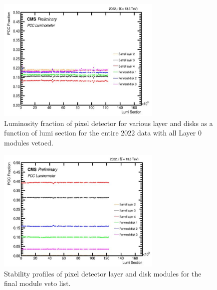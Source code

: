 \begin{figure}[!htp]
  \centering
  \includegraphics[width=0.7\textwidth]{ashish_thesis/PCC_stability_2022_L0veto_4.png}
  \caption[Luminosity Fractions w/o Layer 0 Modules]{Luminosity fraction of pixel detector for various layer and disks as a function of lumi section for the entire 2022 data with all Layer 0 modules vetoed.}
  \label{fig:stabprof_69a}
\end{figure}


\begin{figure}[!htp]
  \centering
  \includegraphics[width=0.7\textwidth]{ashish_thesis/2022_pcc_stability_2.png}
  \caption[Stability Profiles For Final Veto]{Stability profiles of pixel detector layer and disk modules for the final module veto list.}
  \label{fig:stabprof_69b}
\end{figure}


